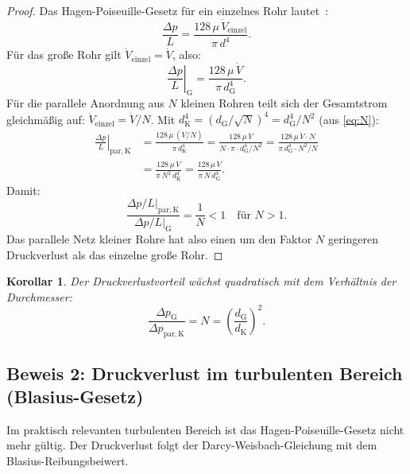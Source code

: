 ﻿\documentclass[12pt,a4paper,twoside]{article}
\theoremstyle{plain}
\newtheorem{corollary}[theorem]{Korollar}
\theoremstyle{definition}
\theoremstyle{remark}
\newcommand{\dG}{d_{\mathrm{G}}}
\newcommand{\dK}{d_{\mathrm{K}}}
\begin{document}
\begin{proof}
Das Hagen-Poiseuille-Gesetz für ein einzelnes Rohr lautet~\cite{White2016}:
\begin{equation}
  \frac{\Delta p}{L} = \frac{128\,\mu\,\dot{V}_{\mathrm{einzel}}}{\pi\,d^4}.
  \label{eq:hp}
\end{equation}
Für das große Rohr gilt $\dot{V}_{\mathrm{einzel}} = \dot{V}$, also:
\begin{equation}
  \left.\frac{\Delta p}{L}\right|_{\mathrm{G}}
    = \frac{128\,\mu\,\dot{V}}{\pi\,\dG^4}.
\end{equation}
Für die parallele Anordnung aus $N$ kleinen Rohren teilt sich der Gesamtstrom
gleichmäßig auf: $\dot{V}_{\mathrm{einzel}} = \dot{V}/N$.
Mit $\dK^4 = \left(\dG/\sqrt{N}\right)^4 = \dG^4/N^2$ (aus \cref{eq:N}):
\begin{align}
  \left.\frac{\Delta p}{L}\right|_{\mathrm{par, K}}
    &= \frac{128\,\mu\,(\dot{V}/N)}{\pi\,\dK^4}
     = \frac{128\,\mu\,\dot{V}}{N \cdot \pi \cdot \dG^4/N^2}
     = \frac{128\,\mu\,\dot{V} \cdot N}{\pi\,\dG^4 \cdot N^2 / N}
     \nonumber \\
    &= \frac{128\,\mu\,\dot{V}}{\pi\,N^2\,\dK^4}
     = \frac{128\,\mu\,\dot{V}}{\pi\,N\,\dG^4}.
\end{align}
Damit:
\begin{equation}
  \frac{\left.\Delta p/L\right|_{\mathrm{par,K}}}
       {\left.\Delta p/L\right|_{\mathrm{G}}}
  = \frac{1}{N} < 1 \quad \text{für } N > 1.
\end{equation}
Das parallele Netz kleiner Rohre hat also einen um den Faktor $N$ geringeren
Druckverlust als das einzelne große Rohr.
\end{proof}

\begin{corollary}
\label{cor:druckverlust_lam}
Der Druckverlustvorteil wächst quadratisch mit dem Verhältnis der Durchmesser:
\begin{equation}
  \frac{\Delta p_{\mathrm{G}}}{\Delta p_{\mathrm{par,K}}}
  = N = \left(\frac{\dG}{\dK}\right)^2.
\end{equation}
\end{corollary}

\subsection{Beweis 2: Druckverlust im turbulenten Bereich (Blasius-Gesetz)}
\label{ssec:beweis_turb}

Im praktisch relevanten turbulenten Bereich ist das Hagen-Poiseuille-Gesetz
nicht mehr gültig.
Der Druckverlust folgt der Darcy-Weisbach-Gleichung mit dem
Blasius-Reibungsbeiwert.
\end{document}
